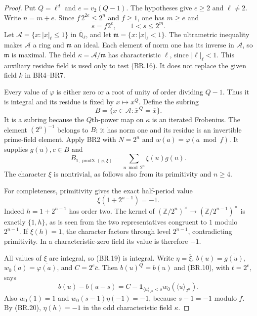 \begin{proof}
Put $Q=\ell^d$ and $e=v_2(Q-1)$.  The hypotheses give $e\ge2$
and $\ell\ne2$.  Write $n=m+e$.  Since
$f\,2^{2e}\le2^n$ and $f\ge1$, one has $m\ge e$ and
\[
                   s=f2^e,\qquad 1<s\le2^m.
                   \tag{BR.17}
\]
Let $\mathcal A=\{x:|x|_\ell\le1\}$ in
$\overline{\mathbb Q}_\ell$, and let
$\mathfrak m=\{x:|x|_\ell<1\}$.  The ultrametric inequality makes
$\mathcal A$ a ring and $\mathfrak m$ an ideal.  Each element of
norm one has its inverse in $\mathcal A$, so $\mathfrak m$ is
maximal.  The field $\kappa=\mathcal A/\mathfrak m$ has
characteristic $\ell$, since $|\ell|_\ell<1$.
This auxiliary residue field is used only to test (BR.16).
It does not replace the given field $k$ in BR4--BR7.

Every value of $\varphi$ is either zero or a root of unity of
order dividing $Q-1$.  Thus it is integral and its residue is
fixed by $x\mapsto x^Q$.  Define the subring
\[
 B=\{x\in\mathcal A:\overline{x}^{\,Q}=\overline{x}\}.
 \tag{BR.18}
\]
It is a subring because the $Q$th-power map on $\kappa$ is an
iterated Frobenius.  The element $(2^n)^{-1}$ belongs to $B$:
it has norm one and its residue is an invertible prime-field element.
Apply BR2 with $N=2^n$ and $w(a)=\varphi(a\bmod f)$.
It supplies $g(u),c\in B$ and
\[
 B_{1,\operatorname{prodX}(\varphi,\xi)}
                         =\sum_{u\bmod 2^n}\xi(u)g(u).
 \tag{BR.19}
\]
The character $\xi$ is nontrivial, as follows also from its
primitivity and $n\ge4$.

For completeness, primitivity gives the exact half-period value
\[
                         \xi(1+2^{n-1})=-1.
                         \tag{BR.20}
\]
Indeed $h=1+2^{n-1}$ has order two.  The kernel of
$(\mathbb Z/2^n)^\times\to(\mathbb Z/2^{n-1})^\times$
is exactly $\{1,h\}$, as is seen from the two representatives
congruent to $1$ modulo $2^{n-1}$.
If $\xi(h)=1$, the character factors through level $2^{n-1}$,
contradicting primitivity.  In a characteristic-zero field its
value is therefore $-1$.

All values of $\xi$ are integral, so (BR.19) is integral.
Write $\eta=\overline{\xi}$, $b(u)=\overline{g(u)}$,
$w_0(a)=\overline{\varphi(a)}$, and $C=2^e\overline c$.
Then $b(u)^Q=b(u)$ and (BR.10), with $t=2^e$, says
\[
 b(u)-b(u-s)
        =C-\mathbf1_{\langle u\rangle_{2^n}<s}
                              w_0(\langle u\rangle_{2^n}).
 \tag{BR.21}
\]
Also $w_0(1)=1$ and
$w_0(s-1)\eta(-1)=-1$, because $s-1=-1$ modulo $f$.
By (BR.20), $\eta(h)=-1$ in the odd characteristic field $\kappa$.


\end{proof}
